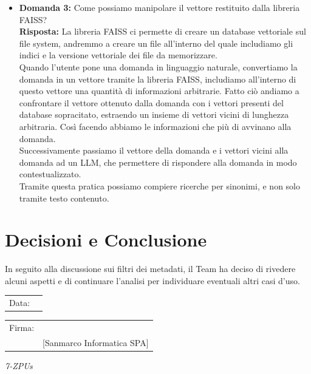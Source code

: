 \documentclass[a4paper,12pt]{article}
\begin{document}
\begin{itemize}
    \item \textbf{Domanda 3:} Come possiamo manipolare il vettore restituito dalla libreria FAISS?
    \\ \textbf{Risposta:} La libreria FAISS ci permette di creare un database vettoriale sul file system, andremmo a creare un file all'interno del quale includiamo gli indici e la versione vettoriale dei file da memorizzare. 
\\ Quando l'utente pone una domanda in linguaggio naturale, convertiamo la domanda in un vettore tramite la libreria FAISS, includiamo all'interno di questo vettore una quantità di informazioni arbitrarie. Fatto ciò andiamo a confrontare il vettore ottenuto dalla domanda con i vettori presenti del database sopracitato, estraendo un insieme di vettori vicini di lunghezza arbitraria. Così facendo abbiamo le informazioni che più di avvinano alla domanda.
\\ Successivamente passiamo il vettore della domanda e i vettori vicini alla domanda ad un LLM, che permettere di rispondere alla domanda in modo contestualizzato.
\\ Tramite questa pratica possiamo compiere ricerche per sinonimi, e non solo tramite testo contenuto.

\end{itemize}


\section{Decisioni e Conclusione}
In seguito alla discussione sui filtri dei metadati, il Team ha deciso di rivedere alcuni aspetti e di continuare l'analisi per individuare eventuali altri casi d'uso.


\vfill


\begin{flushleft}
\begin{tabular}{@{}p{0.5in}p{2in}@{}}
Data: & \hrulefill \\
\end{tabular}

\vspace{1em}

\begin{tabular}{@{}p{0.5in}p{2in}@{}}
Firma: & \hrulefill \\
& [Sanmarco Informatica SPA] \\
\end{tabular}
\end{flushleft}

\begin{flushright}
    \textit{7-ZPUs}
\end{flushright}
\end{document}
